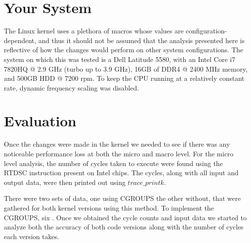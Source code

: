 \documentclass[10pt, conference]{IEEEtran}
\begin{document}




\section{Your System}

The Linux kernel uses a plethora of macros whose values are configuration-dependent, and thus it should not be assumed that the analysis presented here is reflective of how the changes would perform on other system configurations.  The system on which this was tested is a Dell Latitude 5580, with an Intel Core i7 7820HQ @ 2.9 GHz (turbo up to 3.9 GHz), 16GB of DDR4 @ 2400 MHz memory, and 500GB HDD @ 7200 rpm.  To keep the CPU running at a relatively constant rate, dynamic frequency scaling was disabled.

\section{Evaluation}
Once the changes were made in the kernel we needed to see if there was any noticeable performance loss at both the micro and macro level. For the micro level analysis, the number of cycles taken to execute were found using the RTDSC instruction present on Intel chips. The cycles, along with all input and output data, were then printed out using $trace\_printk$.
 
There were two sets of data, one using CGROUPS the other without, that were gathered for both kernel versions using this method. To implement the CGROUPS, six .  Once we obtained the cycle counts and input data we started to analyze both the accuracy of both code versions along with the number of cycles each version takes.

    \begin{center}
	 \label{tab:table1}
\end{center}
\end{document}
